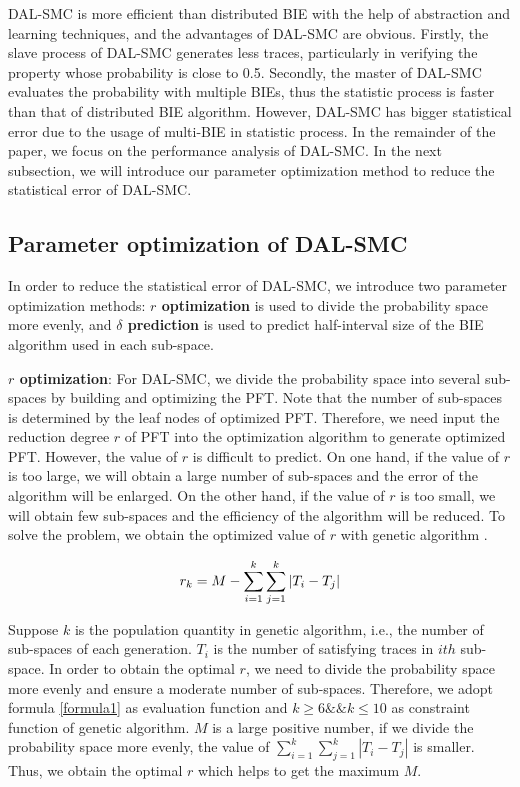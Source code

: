 DAL-SMC is more efficient than distributed BIE with the help of abstraction and learning techniques, and the advantages of DAL-SMC are obvious. Firstly, the slave process of DAL-SMC generates less traces, particularly in verifying the property whose probability is close to 0.5. Secondly, the master of DAL-SMC evaluates the probability with multiple BIEs, thus the statistic process is faster than that of distributed BIE algorithm. However, DAL-SMC has bigger statistical error due to the usage of multi-BIE in statistic process. In the remainder of the paper, we focus on the performance analysis of DAL-SMC.  In the next subsection, we will introduce our parameter optimization method to reduce the statistical error of DAL-SMC. 


\subsection{Parameter optimization of DAL-SMC}
In order to reduce the statistical error of DAL-SMC, we introduce two parameter optimization methods: \textbf{$r$ optimization} is used to divide the probability space more evenly, and \textbf{$\delta$ prediction} is used to predict half-interval size of the BIE algorithm used in each sub-space.

\textbf{$r$ optimization}: For DAL-SMC, we divide the probability space into several sub-spaces by building and optimizing the PFT. Note that the number of sub-spaces is determined by the leaf nodes of optimized PFT. Therefore, we need input the reduction degree $r$ of PFT into the optimization algorithm to generate optimized PFT. However, the value of $r$ is difficult to predict. On one hand, if the value of $r$ is too large, we will obtain a large number of sub-spaces and the error of the algorithm will be enlarged. On the other hand, if the value of $r$ is too small, we will obtain few sub-spaces and the efficiency of the algorithm will be reduced. To solve the problem, we obtain the optimized value of $r$ with genetic algorithm \cite{DBLP:books/daglib/0019871}. 

\begin{equation}
\centering
\label{formula1}
r_k = M - \sum\limits_{i=1}^k \sum\limits_{j=1}^k |T_i - T_j| 
\end{equation}

Suppose $k$ is the population quantity in genetic algorithm, i.e., the number of sub-spaces of each generation. $T_i$ is the number of satisfying traces in $ith$ sub-space. In order to obtain the optimal $r$, we need to divide the probability space more evenly and ensure a moderate number of sub-spaces. Therefore, we adopt formula \ref{formula1} as evaluation function and $k \geq 6 \&\& k \leq 10$ as constraint function of genetic algorithm. $M$ is a large positive number, if we divide the probability space more evenly, the value of $\sum\limits_{i=1}^k \sum\limits_{j=1}^k |T_i - T_j|$ is smaller. Thus, we obtain the optimal $r$ which helps to get the maximum $M$. 

